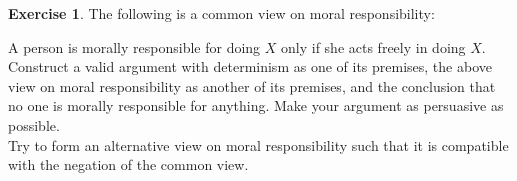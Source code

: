 \documentclass[11pt]{article}
\theoremstyle{definition}
\newtheorem{exer}{Exercise}
\begin{document}
\begin{exer}
\hfill

\noindent
The following is a common view on moral responsibility:

A person is morally responsible for doing $X$ only if she acts freely in doing $X$. \\

\noindent
Construct a valid argument with determinism as one of its premises, the above view on moral responsibility as another of its premises, and the conclusion that no one is morally responsible for anything. Make your argument as persuasive as possible. \\

\noindent
Try to form an alternative view on moral responsibility such that it is compatible with the negation of the common view.

\end{exer}
\end{document}
